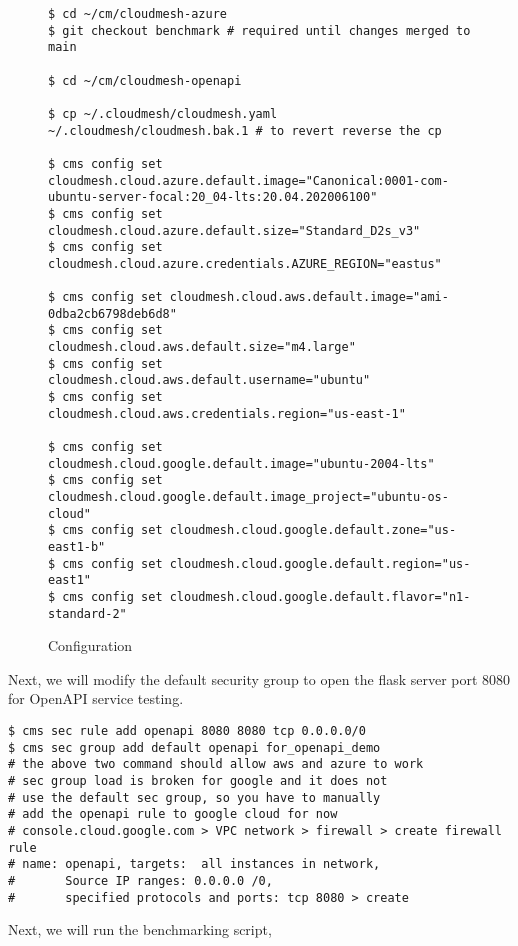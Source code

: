 \begin{figure*}[htb]

\begin{verbatim}
$ cd ~/cm/cloudmesh-azure 
$ git checkout benchmark # required until changes merged to main

$ cd ~/cm/cloudmesh-openapi

$ cp ~/.cloudmesh/cloudmesh.yaml ~/.cloudmesh/cloudmesh.bak.1 # to revert reverse the cp

$ cms config set cloudmesh.cloud.azure.default.image="Canonical:0001-com-ubuntu-server-focal:20_04-lts:20.04.202006100"
$ cms config set cloudmesh.cloud.azure.default.size="Standard_D2s_v3"
$ cms config set cloudmesh.cloud.azure.credentials.AZURE_REGION="eastus"

$ cms config set cloudmesh.cloud.aws.default.image="ami-0dba2cb6798deb6d8"
$ cms config set cloudmesh.cloud.aws.default.size="m4.large"
$ cms config set cloudmesh.cloud.aws.default.username="ubuntu"
$ cms config set cloudmesh.cloud.aws.credentials.region="us-east-1"

$ cms config set cloudmesh.cloud.google.default.image="ubuntu-2004-lts"
$ cms config set cloudmesh.cloud.google.default.image_project="ubuntu-os-cloud"
$ cms config set cloudmesh.cloud.google.default.zone="us-east1-b"
$ cms config set cloudmesh.cloud.google.default.region="us-east1"
$ cms config set cloudmesh.cloud.google.default.flavor="n1-standard-2"
\end{verbatim}

  \caption{Configuration}
  \label{fig:config}
  \end{figure*}

Next, we will modify the default security group to open the flask server
port 8080 for OpenAPI service testing.

\begin{verbatim}
$ cms sec rule add openapi 8080 8080 tcp 0.0.0.0/0
$ cms sec group add default openapi for_openapi_demo
# the above two command should allow aws and azure to work
# sec group load is broken for google and it does not 
# use the default sec group, so you have to manually 
# add the openapi rule to google cloud for now
# console.cloud.google.com > VPC network > firewall > create firewall rule
# name: openapi, targets:  all instances in network, 
#       Source IP ranges: 0.0.0.0 /0, 
#       specified protocols and ports: tcp 8080 > create
\end{verbatim}

Next, we will run the benchmarking script,

